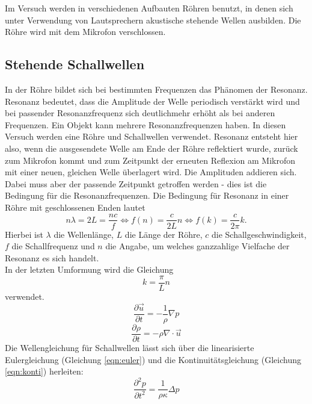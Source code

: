 Im Versuch werden in verschiedenen Aufbauten Röhren benutzt, in denen sich unter Verwendung von Lautsprechern akustische stehende Wellen ausbilden.
Die Röhre wird mit dem Mikrofon verschlossen.\\
%
\subsection{Stehende Schallwellen}
In der Röhre bildet sich bei bestimmten Frequenzen das Phänomen der Resonanz.
Resonanz bedeutet, dass die Amplitude der Welle periodisch verstärkt wird und bei passender Resonanzfrequenz sich deutlichmehr erhöht als bei anderen Frequenzen.
Ein Objekt kann mehrere Resonanzfrequenzen haben.
In diesen Versuch werden eine Röhre und Schallwellen verwendet.
Resonanz entsteht hier also, wenn die ausgesendete Welle am Ende der Röhre reflektiert wurde, zurück zum Mikrofon kommt und zum Zeitpunkt der erneuten Reflexion am Mikrofon mit einer neuen, gleichen Welle überlagert wird.
Die Amplituden addieren sich.
Dabei muss aber der passende Zeitpunkt getroffen werden - dies ist die Bedingung für die Resonanzfrequenzen.
Die Bedingung für Resonanz in einer Röhre mit geschlossenen Enden lautet
\begin{equation}
  n \lambda = 2 L = \frac{n c}{f} \Leftrightarrow f(n) = \frac{c}{2L} n \Leftrightarrow f(k) = \frac{c}{2\pi} k.
  \label{eqn:dispersionschall}
\end{equation}
Hierbei ist $\lambda$ die Wellenlänge, $L$ die Länge der Röhre, $c$ die Schallgeschwindigkeit, $f$ die Schallfrequenz und $n$ die Angabe, um welches ganzzahlige Vielfache der Resonanz es sich handelt.\\
In der letzten Umformung wird die Gleichung
\begin{equation}
  k = \frac{\pi}{L} n
  \label{eqn:wellenzahl}
\end{equation}
verwendet.
%
\begin{equation}
  \frac{ \partial \vec{u}}{ \partial t} = - \frac{1}{\rho} \nabla p
  \label{eqn:euler}
\end{equation}
\begin{equation}
  \frac{\partial \rho}{ \partial t} = - \rho \nabla \cdot \vec{u}
  \label{eqn:konti}
\end{equation}
%
Die Wellengleichung für Schallwellen lässt sich über die linearisierte Eulergleichung (Gleichung \eqref{eqn:euler}) und die Kontinuitätsgleichung (Gleichung \eqref{eqn:konti}) herleiten:
\begin{equation}
  \frac{ \partial^2 p}{\partial t^2} = \frac{1}{\rho \kappa} \Delta p
  \label{eqn:schallwelle}
\end{equation}
